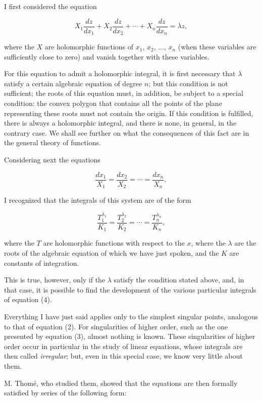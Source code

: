 \documentclass[11pt]{article}
\begin{document}
I first considered the equation

\begin{equation}
X_1\frac{dz}{dx_1}+X_2\frac{dz}{dx_2}+\cdots+X_n\frac{dz}{dx_n}=\lambda z,
\end{equation}

where the $X$ are holomorphic functions of $x_1$, $x_2$, ..., $x_n$ (when these variables are sufficiently close to zero) and vanish together with these variables.

For this equation to admit a holomorphic integral, it is first necessary that $\lambda$ satisfy a certain algebraic equation of degree $n$; but this condition is not sufficient; the roots of this equation must, in addition, be subject to a special condition: the convex polygon that contains all the points of the plane representing these roots must not contain the origin. If this condition is fulfilled, there is always a holomorphic integral, and there is none, in general, in the contrary case. We shall see further on what the consequences of this fact are in the general theory of functions.

Considering next the equations

\[
\frac{dx_1}{X_1}=\frac{dx_2}{X_2}=\cdots=\frac{dx_n}{X_n},
\]

I recognized that the integrals of this system are of the form

\[
\frac{T_1^{\lambda_1}}{K_1}=\frac{T_2^{\lambda_2}}{K_2}=\cdots=\frac{T_n^{\lambda_n}}{K_n},
\]

where the $T$ are holomorphic functions with respect to the $x$, where the $\lambda$ are the roots of the algebraic equation of which we have just spoken, and the $K$ are constants of integration.

This is true, however, only if the $\lambda$ satisfy the condition stated above, and, in that case, it is possible to find the development of the various particular integrals of equation (4).

Everything I have just said applies only to the simplest singular points, analogous to that of equation (2). For singularities of higher order, such as the one presented by equation (3), almost nothing is known. These singularities of higher order occur in particular in the study of linear equations, whose integrals are then called \emph{irregular}; but, even in this special case, we know very little about them.

M. Thomé, who studied them, showed that the equations are then formally satisfied by series of the following form:
\end{document}
